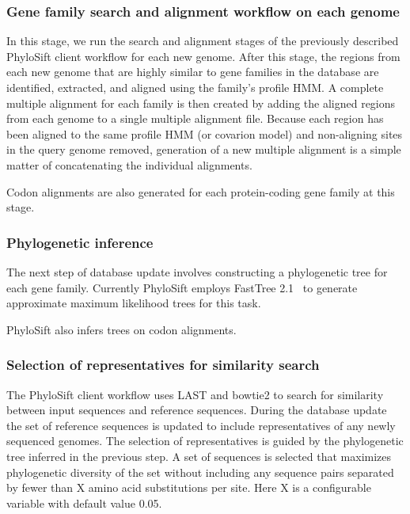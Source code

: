 \documentclass[10pt]{article}
\begin{document}
\subsubsection*{Gene family search and alignment workflow on each genome}
In this stage, we run the search and alignment stages of the previously described PhyloSift client workflow for each new genome.
After this stage, the regions from each new genome that are highly similar to gene families in the database are identified, extracted, and aligned using the family's profile HMM.
A complete multiple alignment for each family is then created by adding the aligned regions from each genome to a single multiple alignment file.
Because each region has been aligned to the same profile HMM (or covarion model) and non-aligning sites in the query genome removed, generation of a new multiple alignment is a simple matter of concatenating the individual alignments.

Codon alignments are also generated for each protein-coding gene family at this stage.
\subsubsection*{Phylogenetic inference}
The next step of database update involves constructing a phylogenetic tree for each gene family.
Currently PhyloSift employs FastTree 2.1~\cite{Price2010} to generate approximate maximum likelihood trees for this task.

PhyloSift also infers trees on codon alignments. 

\subsubsection*{Selection of representatives for similarity search}
The PhyloSift client workflow uses LAST and bowtie2 to search for similarity between input sequences and reference sequences.
During the database update the set of reference sequences is updated to include representatives of any newly sequenced genomes.
The selection of representatives is guided by the phylogenetic tree inferred in the previous step.
A set of sequences is selected that maximizes phylogenetic diversity of the set without including any sequence pairs separated by fewer than X amino acid substitutions per site.
Here X is a configurable variable with default value 0.05.
\end{document}
